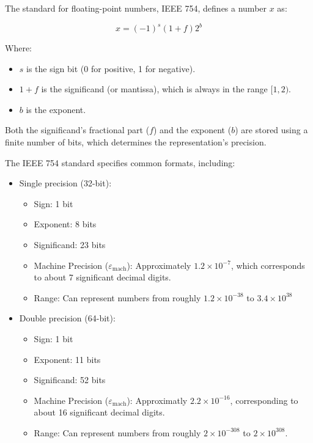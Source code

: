 The standard for floating-point numbers, IEEE 754, defines a number $x$ as:

\begin{equation}
    x = (-1)^{s} (1 + f) 2^{b}
\end{equation}

Where:
\begin{itemize}
    \item $s$ is the sign bit (0 for positive, 1 for negative).
    \item $1 + f$ is the significand (or mantissa), which is always in the range $[1, 2)$.
    \item $b$ is the exponent.
\end{itemize}

Both the significand's fractional part ($f$) and the exponent ($b$) are stored using a finite number of bits, which determines the representation's precision.

The IEEE 754 standard specifies common formats, including:
\begin{itemize}
    \item Single precision (32-bit):
    \begin{itemize}
        \item Sign: 1 bit
        \item Exponent: 8 bits
        \item Significand: 23 bits
        \item Machine Precision ($\varepsilon_\text{mach}$): Approximately $1.2 \times 10^{-7}$, which corresponds to about 7 significant decimal digits.
        \item Range: Can represent numbers from roughly $1.2 \times 10^{-38}$ to $3.4 \times 10^{38}$
    \end{itemize}
    \item Double precision (64-bit):
    \begin{itemize}
        \item Sign: 1 bit
        \item Exponent: 11 bits
        \item Significand: 52 bits
        \item Machine Precision ($\varepsilon_\text{mach}$): Approximatly $2.2 \times 10^{-16}$, corresponding to about 16 significant decimal digits.
        \item Range: Can represent numbers from roughly $2 \times 10^{-308}$ to $2 \times 10^{308}$.
    \end{itemize}
\end{itemize}

